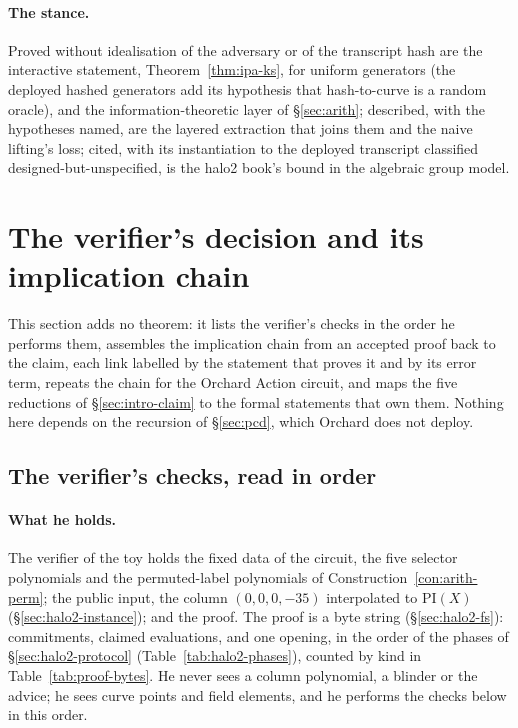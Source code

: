 \documentclass[11pt,a4paper]{article}
\theoremstyle{definition}
\begin{document}
\paragraph{The stance.}
Proved without idealisation of the adversary or of the transcript hash
are the interactive statement, Theorem~\ref{thm:ipa-ks}, for uniform
generators (the deployed hashed generators add its hypothesis that
hash-to-curve is a random oracle), and the information-theoretic layer of
\S\ref{sec:arith}; described, with the hypotheses named, are the layered
extraction that joins them and the naive lifting's loss; cited, with its
instantiation to the deployed transcript classified
designed-but-unspecified, is the halo2 book's bound in the algebraic
group model.


\section{The verifier's decision and its implication chain}
\label{sec:verdict}

This section adds no theorem: it lists the verifier's checks in the
order he performs them, assembles the implication chain from an accepted
proof back to the claim, each link labelled by the statement that
proves it and by its error term, repeats the chain for the Orchard
Action circuit, and maps the five reductions of \S\ref{sec:intro-claim}
to the formal statements that own them. Nothing here depends on the
recursion of \S\ref{sec:pcd}, which Orchard does not deploy.

\subsection{The verifier's checks, read in order}
\label{sec:verdict-checks}

\paragraph{What he holds.}
The verifier of the toy holds the fixed data of the circuit, the five
selector polynomials and the permuted-label polynomials of
Construction~\ref{con:arith-perm}; the public input, the column
$(0, 0, 0, -35)$ interpolated to $\mathrm{PI}(X)$
(\S\ref{sec:halo2-instance}); and the proof. The proof is a byte string
(\S\ref{sec:halo2-fs}): commitments, claimed evaluations, and one
opening, in the order of the phases of \S\ref{sec:halo2-protocol}
(Table~\ref{tab:halo2-phases}), counted by kind in
Table~\ref{tab:proof-bytes}. He never sees a column polynomial, a
blinder or the advice; he sees curve points and field elements, and he
performs the checks below in this order.
\end{document}
